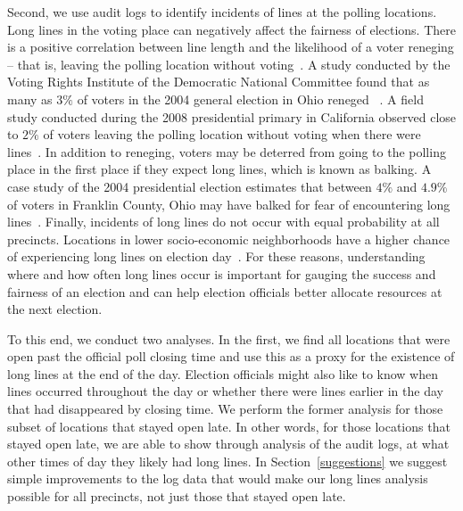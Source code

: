 \documentclass[letterpaper,twocolumn,10pt]{article}
\begin{document}
Second, we use audit logs to identify incidents of lines at the polling
locations. Long lines in the voting place can
negatively affect the fairness of elections. There is a positive correlation
between line length and the likelihood of a voter reneging -- that is, leaving
the polling location without voting~\cite{Spencer2010}. A study conducted by the
Voting Rights Institute of the Democratic National Committee found that as many
as $3\%$ of voters in the 2004 general election in Ohio reneged
~\cite{DNC2005}. A field study conducted 
during the 2008 presidential primary in California observed close to $2\%$
of voters leaving the polling location without voting when there were
lines~\cite{Spencer2010}. In addition to reneging, voters may be deterred from
going to the polling place in the first place if they expect long lines, which is
known as balking. A case study of the 2004 presidential election estimates that
between $4\%$ and $4.9\%$ of voters in Franklin County, Ohio may have balked for
fear of encountering long lines~\cite{Allen2006}. Finally, incidents of long
lines do not occur with equal probability at all precincts. Locations in lower
socio-economic neighborhoods have a higher chance of experiencing long lines on
election day~\cite{Spencer2010,DNC2005}. For these reasons, understanding where  
and how often long lines occur is important for gauging the success and fairness
of an election and can help election officials better allocate resources at the
next election. 

To this end, we conduct two analyses. In the first, we find all
locations that were open past the official poll closing time and use this as a
proxy for the existence of long lines at the end of the day. Election officials
might also like to know when lines occurred throughout the day or whether there
were lines earlier in the day that had disappeared by closing time. We perform
the former 
analysis for those subset of locations that stayed open late. In other words,
for those locations that stayed open late, we are able to show through analysis
of the audit logs, at what other times of day they likely had long
lines. In Section~\ref{suggestions} we suggest simple improvements to the log
data that would make our long lines analysis possible for all precincts, not
just those that stayed open late.

\end{document}
